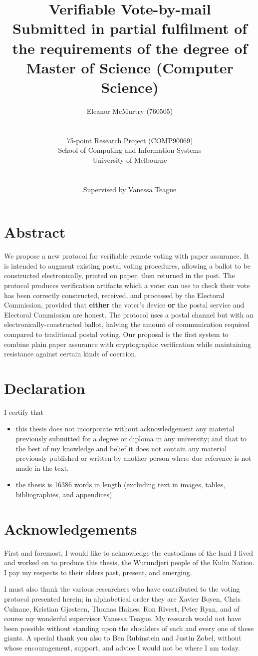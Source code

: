 \documentclass[12pt,a4paper]{article}
\title{Verifiable Vote-by-mail\\\large Submitted in partial fulfilment of the requirements of the degree of\\Master of Science (Computer Science)}
\author{Eleanor McMurtry (760505)\\\\\\75-point Research Project (COMP90069)\\School of Computing and Information Systems\\University of Melbourne\\\\\\Supervised by Vanessa Teague}
\theoremstyle{definition}
\begin{document}
\maketitle
\newpage
\tableofcontents
\newpage
\section*{Abstract}
We propose a new protocol for verifiable remote voting with paper assurance. It is intended to augment existing postal voting procedures, allowing a ballot to be constructed electronically, printed on paper, then returned in the post. The protocol produces verification artifacts which a voter can use to check their vote has been correctly constructed, received, and processed by the Electoral Commission, provided that \textbf{either} the voter's device \textbf{or} the postal service and Electoral Commission are honest. The protocol uses a postal channel but with an electronically-constructed ballot, halving the amount of communication required compared to traditional postal voting. Our proposal is the first system to combine plain paper assurance with cryptographic verification while maintaining resistance against certain kinds of coercion.
\newpage
\section*{Declaration}
I certify that
\begin{itemize}
    \item this thesis does not incorporate without acknowledgement any material previously submitted for a degree or diploma in any university; and that to the best of my knowledge and belief it does not contain any material previously published or written by another person where due reference is not made in the text.
    \item the thesis is 16386 words in length (excluding text in images, tables, bibliographies, and appendices).
\end{itemize}
\newpage
\section*{Acknowledgements}
First and foremost, I would like to acknowledge the custodians of the land I lived and worked on to produce this thesis, the Wurundjeri people of the Kulin Nation. I pay my respects to their elders past, present, and emerging.

I must also thank the various researchers who have contributed to the voting protocol presented herein; in alphabetical order they are Xavier Boyen, Chris Culnane, Kristian Gjøsteen, Thomas Haines, Ron Rivest, Peter Ryan, and of course my wonderful supervisor Vanessa Teague. My research would not have been possible without standing upon the shoulders of each and every one of these giants. A special thank you also to Ben Rubinstein and Justin Zobel, without whose encouragement, support, and advice I would not be where I am today.
\end{document}
